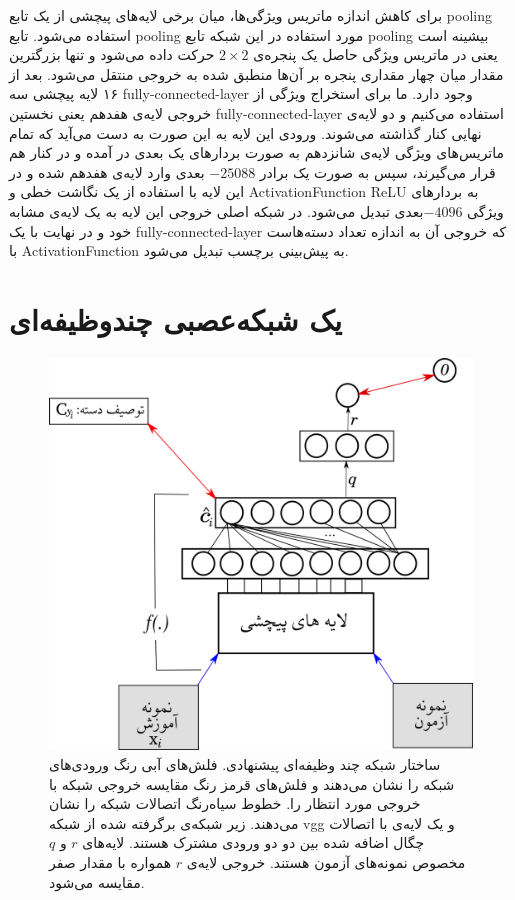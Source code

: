  برای کاهش اندازه ماتریس ویژگی‌ها، میان برخی لایه‌های پیچشی از یک تابع \gls{pooling} استفاده می‌شود. تابع \gls{pooling} مورد استفاده در این شبکه تابع \gls{pooling} بیشینه است یعنی در ماتریس ویژگی‌ حاصل یک پنجره‌ی $2 \times 2$ حرکت داده می‌شود و تنها بزرگترین مقدار میان چهار مقداری پنجره بر آن‌ها منطبق شده به خروجی منتقل می‌شود. بعد از ۱۶ لایه پیچشی سه \gls{fully-connected-layer} وجود دارد. ما برای استخراج ویژگی از خروجی لایه‌ی هفدهم یعنی نخستین  \gls{fully-connected-layer} استفاده می‌کنیم و دو لایه‌ی نهایی کنار گذاشته می‌شوند. ورودی این لایه به این صورت به دست می‌آید که تمام ماتریس‌های ویژگی لایه‌ی شانزدهم به صورت بردارهای یک بعدی در آمده و در کنار هم قرار می‌گیرند، سپس به صورت یک برادر $-25088$ بعدی وارد لایه‌ی هفدهم شده و در این لایه با استفاده از یک نگاشت خطی و \gls{ActivationFunction}   \gls{ReLU} به بردارهای ویژگی $-4096$بعدی تبدیل می‌شود. در شبکه اصلی خروجی این لایه به یک لایه‌ی مشابه خود و در نهایت با یک  \gls{fully-connected-layer} که خروجی آن به اندازه تعداد دسته‌هاست با  \gls{ActivationFunction}
 به پیش‌بینی برچسب تبدیل می‌شود.

\section{یک شبکه‌عصبی چندوظیفه‌ای}\label{nn}
\begin{figure}[!t]
\centering
\includegraphics[width=0.85\linewidth]{images/net}
\caption[شبکه‌ی چندوظیفه‌ای پیشنهادی]{
ساختار شبکه چند وظیفه‌ای پیشنهادی. فلش‌های آبی رنگ ورودی‌های شبکه را نشان می‌دهند و فلش‌های قرمز رنگ مقایسه خروجی شبکه با خروجی مورد انتظار را. خطوط سیاه‌رنگ اتصالات شبکه‌ را نشان می‌دهند. زیر شبکه‌ی برگرفته شده از شبکه vgg و یک لایه‌ی با اتصالات چگال اضافه شده بین دو دو ورودی مشترک هستند. لایه‌های $r$ و $q$ مخصوص نمونه‌های آزمون هستند. خروجی لایه‌ی $r$ همواره با مقدار صفر مقایسه می‌شود.
}
\label{fig:nn2}
\end{figure}

